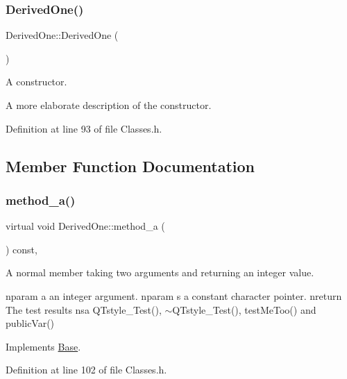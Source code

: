 \subsubsection{\texorpdfstring{Derived\+One()}{DerivedOne()}}
{\footnotesize\ttfamily Derived\+One\+::\+Derived\+One (\begin{DoxyParamCaption}{ }\end{DoxyParamCaption})\hspace{0.3cm}{\ttfamily [inline]}}



A constructor. 

A more elaborate description of the constructor. 

Definition at line 93 of file Classes.\+h.



\subsection{Member Function Documentation}
\mbox{\label{class_derived_one_a2843e6e6fd03fa84efda261cd1bbc10d}} 
\subsubsection{\texorpdfstring{method\+\_\+a()}{method\_a()}}
{\footnotesize\ttfamily virtual void Derived\+One\+::method\+\_\+a (\begin{DoxyParamCaption}{ }\end{DoxyParamCaption}) const\hspace{0.3cm}{\ttfamily [inline]}, {\ttfamily [virtual]}}



A normal member taking two arguments and returning an integer value. 

nparam a an integer argument. nparam s a constant character pointer. nreturn The test results nsa Q\+Tstyle\+\_\+\+Test(), $\sim$\+Q\+Tstyle\+\_\+\+Test(), test\+Me\+Too() and public\+Var() 

Implements \hyperlink{class_base_ace5096ac7dfb41f2577321923e3048bf}{Base}.



Definition at line 102 of file Classes.\+h.

\mbox{\label{class_derived_one_aa98db10f4b7ca15905aa82d942afe51b}} 
